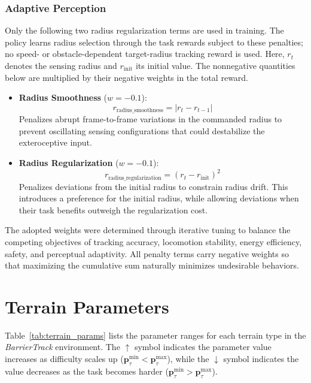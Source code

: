 \subsubsection*{Adaptive Perception}
Only the following two radius regularization terms are used in training. The policy learns radius selection through the task rewards subject to these penalties; no speed- or obstacle-dependent target-radius tracking reward is used. Here, $r_t$ denotes the sensing radius and $r_{\mathrm{init}}$ its initial value. The nonnegative quantities below are multiplied by their negative weights in the total reward.
\begin{itemize}
    \item \textbf{Radius Smoothness} ($w = -0.1$):
    \begin{equation}
        r_{\text{radius\_smoothness}} = |r_t - r_{t-1}|
    \end{equation}
    Penalizes abrupt frame-to-frame variations in the commanded radius to prevent oscillating sensing configurations that could destabilize the exteroceptive input.
    \item \textbf{Radius Regularization} ($w = -0.1$):
    \begin{equation}
        r_{\text{radius\_regularization}} = (r_t - r_{\mathrm{init}})^2
    \end{equation}
    Penalizes deviations from the initial radius to constrain radius drift. This introduces a preference for the initial radius, while allowing deviations when their task benefits outweigh the regularization cost.
\end{itemize}

The adopted weights were determined through iterative tuning to balance the competing objectives of tracking accuracy, locomotion stability, energy efficiency, safety, and perceptual adaptivity. All penalty terms carry negative weights so that maximizing the cumulative sum naturally minimizes undesirable behaviors.

\section{Terrain Parameters}

Table~\ref{tab:terrain_params} lists the parameter ranges for each terrain type in the \textit{BarrierTrack} environment. The $\uparrow$ symbol indicates the parameter value increases as difficulty scales up ($\mathbf{p}_\tau^{\min} < \mathbf{p}_\tau^{\max}$), while the $\downarrow$ symbol indicates the value decreases as the task becomes harder ($\mathbf{p}_\tau^{\min} > \mathbf{p}_\tau^{\max}$).

